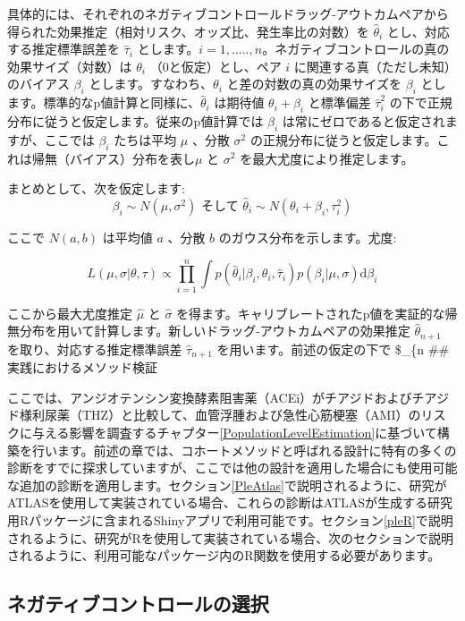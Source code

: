 \documentclass[
  11pt]{book}
\theoremstyle{definition}
\theoremstyle{definition}
\theoremstyle{definition}
\theoremstyle{definition}
\theoremstyle{remark}
\begin{document}
具体的には、それぞれのネガティブコントロールドラッグ-アウトカムペアから得られた効果推定（相対リスク、オッズ比、発生率比の対数）を \(\hat{\theta}_i\) とし、対応する推定標準誤差を \(\hat{\tau}_i\) とします。\(i=1,.....,n\)。ネガティブコントロールの真の効果サイズ（対数）は \(\theta_i\) （0と仮定）とし、ペア \(i\) に関連する真（ただし未知）のバイアス \(\beta_i\) とします。すなわち、\(\theta_i\) と差の対数の真の効果サイズを \(\beta_i\) とします。標準的なp値計算と同様に、\(\hat{\theta}_i\) は期待値 \(\theta_i + \beta_i\) と標準偏差 \(\hat{\tau}_i^2\) の下で正規分布に従うと仮定します。従来のp値計算では \(\beta_i\) は常にゼロであると仮定されますが、ここでは \(\beta_i\) たちは平均 \(\mu\) 、分散 \(\sigma^2\) の正規分布に従うと仮定します。これは帰無（バイアス）分布を表し\(\mu\) と \(\sigma^2\) を最大尤度により推定します。

まとめとして、次を仮定します:
\[\beta_i \sim N(\mu,\sigma^2) \text{  そして  } \hat{\theta}_i \sim N(\theta_i + \beta_i, \tau_i^2)\]

ここで \(N(a,b)\) は平均値 \(a\) 、分散 \(b\) のガウス分布を示します。尤度:

\[L(\mu, \sigma | \theta, \tau) \propto \prod_{i=1}^{n}\int p(\hat{\theta}_i|\beta_i, \theta_i, \hat{\tau}_i)p(\beta_i|\mu, \sigma) \text{d}\beta_i\]

ここから最大尤度推定 \(\hat{\mu}\) と \(\hat{\sigma}\) を得ます。キャリブレートされたp値を実証的な帰無分布を用いて計算します。新しいドラッグ-アウトカムペアの効果推定 \(\hat{\theta}_{n+1}\) を取り、対応する推定標準誤差 \(\hat{\tau}_{n+1}\) を用います。前述の仮定の下で \$\beta\_\{n
\#\# 実践におけるメソッド検証

ここでは、アンジオテンシン変換酵素阻害薬（ACEi）がチアジドおよびチアジド様利尿薬（THZ）と比較して、血管浮腫および急性心筋梗塞（AMI）のリスクに与える影響を調査するチャプター\ref{PopulationLevelEstimation}に基づいて構築を行います。前述の章では、コホートメソッドと呼ばれる設計に特有の多くの診断をすでに探求していますが、ここでは他の設計を適用した場合にも使用可能な追加の診断を適用します。セクション\ref{PleAtlas}で説明されるように、研究がATLASを使用して実装されている場合、これらの診断はATLASが生成する研究用Rパッケージに含まれるShinyアプリで利用可能です。セクション\ref{pleR}で説明されるように、研究がRを使用して実装されている場合、次のセクションで説明されるように、利用可能なパッケージ内のR関数を使用する必要があります。

\subsection{ネガティブコントロールの選択}\label{ux30cdux30acux30c6ux30a3ux30d6ux30b3ux30f3ux30c8ux30edux30fcux30ebux306eux9078ux629e}
\end{document}
